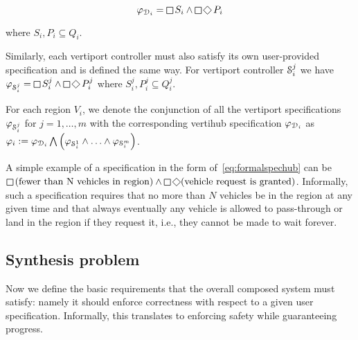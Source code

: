 \begin{equation}\label{eq:formalspechub}
    \varphi_{\design_i} = \LTLglobally S_i \wedge \LTLglobally \LTLfinally P_i
\end{equation}

\noindent where $S_i, P_i \subseteq Q_i$. 

Similarly, each vertiport controller must also satisfy its own user-provided specification and is defined the same way. For vertiport controller $\mathcal{S}^j_i$ we have $\varphi_{\shield^{j}_i} = \LTLglobally S_{i}^j \wedge \LTLglobally \LTLfinally P_{i}^j$ where $S_{i}^j, P_{i}^j \subseteq Q_i^j$. 

For each region $V_i$, we denote the conjunction of all the vertiport specifications $\varphi_{\mathcal{S}^{j}_i}$ for $j=1,\ldots,m$ with the corresponding vertihub specification $\varphi_{\mathcal{D}_i}$ as $\varphi_i := \varphi_{\mathcal{D}_i} \bigwedge \left( \varphi_{\mathcal{S}^{1}_i} \wedge \ldots \wedge 
\varphi_{\mathcal{S}^{m}_i}\right)$. 

\begin{eg}
A simple example of a specification in the form of~\eqref{eq:formalspechub} can be $\LTLglobally \left(\text{fewer than N vehicles in region} \right) \wedge \LTLglobally\LTLfinally (\text{vehicle request is granted})$. Informally, such a specification requires that no more than $N$ vehicles be in the region at any given time and that always eventually any vehicle is allowed to pass-through or land in the region if they request it, i.e., they cannot be made to wait forever. 
\end{eg}


\subsection{Synthesis problem}\label{sec_correctness}

Now we define the basic  requirements that the overall composed system must satisfy: namely it should enforce correctness with respect to a given user specification.
Informally, this translates to enforcing safety while guaranteeing progress. 


